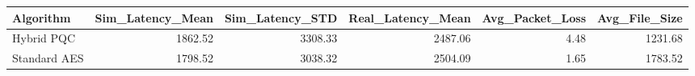 \begin{tabular}{lrrrrr}
\toprule
Algorithm & Sim_Latency_Mean & Sim_Latency_STD & Real_Latency_Mean & Avg_Packet_Loss & Avg_File_Size \\
\midrule
Hybrid PQC & 1862.52 & 3308.33 & 2487.06 & 4.48 & 1231.68 \\
Standard AES & 1798.52 & 3038.32 & 2504.09 & 1.65 & 1783.52 \\
\bottomrule
\end{tabular}
